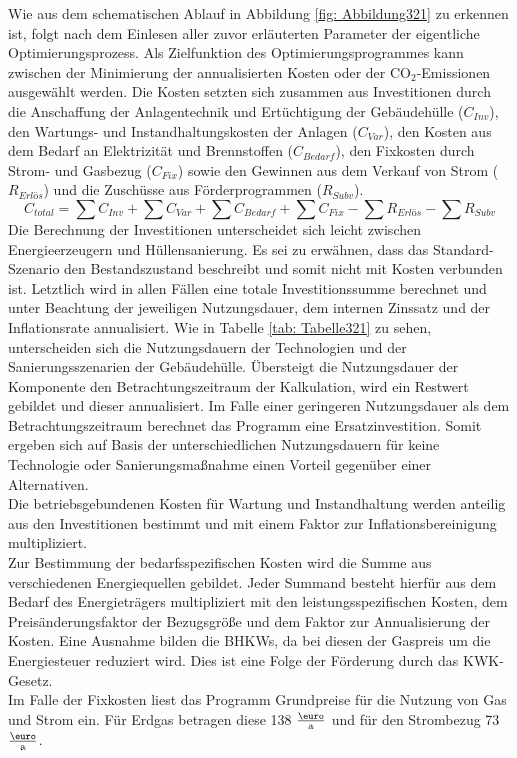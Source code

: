 Wie aus dem schematischen Ablauf in Abbildung \ref{fig: Abbildung321} zu erkennen ist, folgt nach dem Einlesen aller zuvor erläuterten Parameter der eigentliche Optimierungsprozess.
Als Zielfunktion des Optimierungsprogrammes kann zwischen der Minimierung der annualisierten Kosten oder der CO\(_2\)-Emissionen ausgewählt werden.
Die Kosten setzten sich zusammen aus Investitionen durch die Anschaffung der Anlagentechnik und Ertüchtigung der Gebäudehülle (\(C_{Inv}\)), den Wartungs- und Instandhaltungskosten der Anlagen (\(C_{Var}\)), den Kosten aus dem Bedarf an Elektrizität und Brennstoffen (\(C_{Bedarf}\)), den Fixkosten durch Strom- und Gasbezug (\(C_{Fix}\)) sowie den Gewinnen aus dem Verkauf von Strom (\(R_{Erlös}\)) und die Zuschüsse aus Förderprogrammen (\(R_{Subv}\)).
\begin{equation}
\label{eq:Gleichung321}
C_{total} = \sum C_{Inv} + \sum C_{Var} + \sum C_{Bedarf} + \sum C_{Fix} - \sum R_{Erlös} - \sum R_{Subv}  
\end{equation}
Die Berechnung der Investitionen unterscheidet sich leicht zwischen Energieerzeugern und Hüllensanierung.
Es sei zu erwähnen, dass das Standard-Szenario den Bestandszustand beschreibt und somit nicht mit Kosten verbunden ist.
Letztlich wird in allen Fällen eine totale Investitionssumme berechnet und unter Beachtung der jeweiligen Nutzungsdauer, dem internen Zinssatz und der Inflationsrate annualisiert.
Wie in Tabelle \ref{tab: Tabelle321} zu sehen, unterscheiden sich die Nutzungsdauern der Technologien und der Sanierungsszenarien der Gebäudehülle.
Übersteigt die Nutzungsdauer der Komponente den Betrachtungszeitraum der Kalkulation, wird ein Restwert gebildet und dieser annualisiert.
Im Falle einer geringeren Nutzungsdauer als dem Betrachtungszeitraum berechnet das Programm eine Ersatzinvestition.
Somit ergeben sich auf Basis der unterschiedlichen Nutzungsdauern für keine Technologie oder Sanierungsmaßnahme einen Vorteil gegenüber einer Alternativen.\\
Die betriebsgebundenen Kosten für Wartung und Instandhaltung werden anteilig aus den Investitionen bestimmt und mit einem Faktor zur Inflationsbereinigung multipliziert.\\
Zur Bestimmung der bedarfsspezifischen Kosten wird die Summe aus verschiedenen Energiequellen gebildet. Jeder Summand besteht hierfür aus dem Bedarf des Energieträgers multipliziert mit den leistungsspezifischen Kosten, dem Preisänderungsfaktor der Bezugsgröße und dem Faktor zur Annualisierung der Kosten. 
Eine Ausnahme bilden die BHKWs, da bei diesen der Gaspreis um die Energiesteuer reduziert wird.
Dies ist eine Folge der Förderung durch das KWK-Gesetz.\\
Im Falle der Fixkosten liest das Programm Grundpreise für die Nutzung von Gas und Strom ein.
Für Erdgas betragen diese 138 \(\frac{\text{\euro}}{\text{a}}\) und für den Strombezug 73 \(\frac{\text{\euro}}{\text{a}}\). \\

